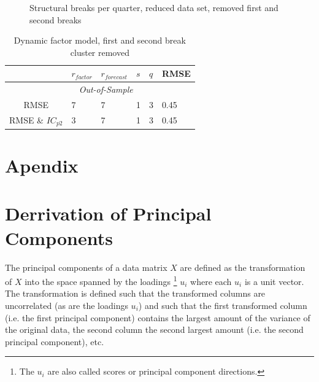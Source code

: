 \documentclass[11pt]{article}
\begin{document}
\begin{figure}[htp]
	\centering
	\caption{Structural breaks per quarter, reduced data set, removed first and second breaks}
	\label{breaks per period, reduced data set, removed first breaks}
\end{figure}

\begin{table}[ht]
	\caption{Dynamic factor model, first and second break cluster removed}
	\label{results dynamic factor model, first and second break cluster removed}
	\centering
	\begin{tabular}{c|lllll}
		  & $r_{factor}$ & $r_{forecast}$ & $s$ & $q$ & RMSE\\
		 \hline
		 \hline

		  & \multicolumn{3}{c}{\textit{Out-of-Sample}} \\ 
		   	RMSE & 7 & 7 & 1 & 3 & 0.45 \\
		   	RMSE \& $IC_{p2}$ & 3 & 7 & 1 & 3 & 0.45 \\
		  \hline
	\end{tabular}
\end{table}



\newpage
\appendix
\section*{Apendix}

\section{Derrivation of Principal Components}
\label{Derrivation of Principal Components}
The principal components of a data matrix $X$ are defined as the transformation of $X$ into the space spanned by the loadings \footnote{The $u_i$ are also called scores or principal component directions.} $u_i$ where each $u_i$ is a unit vector. The transformation is defined such that the transformed columns are uncorrelated (as are the loadings $u_i$) and such that the first transformed column (i.e. the first principal component) contains the largest amount of the variance of the original data, the second column the second largest amount (i.e. the second principal component), etc. \\
\end{document}
